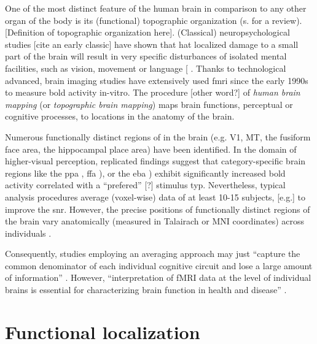 
%
One of the most distinct feature of the human brain in comparison to any other
organ of the body is its (functional) topographic organization (s.
\citep{debeck2008interpreting} for a review).
%
[Definition of topographic organization here].
%
(Classical) neuropsychological studies [cite an early classic] have shown that
hat localized damage to a small part of the brain will result in very speciﬁc
disturbances of isolated mental facilities, such as vision, movement or language
[\citep{rorden2004using} \citep{eickhoff2018topographic}.
%
Thanks to technological advanced, brain imaging studies have extensively used
\ac{fmri} since the early 1990s to measure \ac{bold} activity in-vitro.
%
The procedure [other word?] of \textit{human brain mapping} (or
\textit{topographic brain mapping}) maps brain functions, perceptual or
cognitive processes, to locations in the anatomy of the brain.

%
Numerous functionally distinct regions of in the brain (e.g. V1, MT, the
fusiform face area, the hippocampal place area) have been identified.
In the domain of higher-visual perception, replicated findings suggest that
category-specific brain regions like the \ac{ppa} \citep{epstein1998ppa},
\ac{ffa} \citep{kanwisher1997ffa}), or the \ac{eba} \citep{downing2001bodyarea})
exhibit significantly increased \ac{bold} activity correlated with a
``prefered'' [?] stimulus typ.
%
Nevertheless, typical analysis procedures average (voxel-wise) data of at least
10-15 subjects, [e.g.] to improve the \ac{snr}.
%
%
However, the precise positions of functionally distinct regions of the brain
vary anatomically (measured in Talairach or MNI coordinates) across individuals
\citep{saxe2006divide}.

%
Consequently, studies employing an averaging approach may just ``capture the
common denominator of each individual cognitive circuit and lose a large amount
of information'' \citep{pinel2007fast}.
%
However, ``interpretation of fMRI data at the level of individual brains is
essential for characterizing brain function in health and disease''
\citep{dubois2016building}.


\section{Functional localization}

